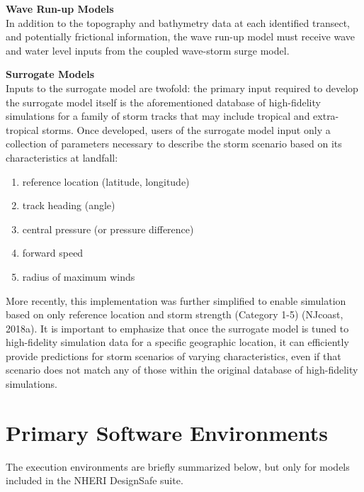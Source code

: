 \noindent\textbf{Wave Run-up Models} \\In addition to the topography and bathymetry data at each identified transect, and potentially frictional information, the wave run-up model must receive wave and water level inputs from the coupled wave-storm surge model.
\newline

\noindent\textbf{Surrogate Models} \\Inputs to the surrogate model are twofold: the primary input required to develop the surrogate model itself is the aforementioned database of high-fidelity simulations for a family of storm tracks that may include tropical and extra-tropical storms. Once developed, users of the surrogate model input only a collection of parameters necessary to describe the storm scenario based on its characteristics at landfall: 

\begin{enumerate}
    \item reference location (latitude, longitude)
    \item track heading (angle)
    \item central pressure (or pressure difference)
    \item forward speed
    \item radius of maximum winds
\end{enumerate}

More recently, this implementation was further simplified to enable simulation based on only reference location and storm strength (Category 1-5) (NJcoast, 2018a). It is important to emphasize that once the surrogate model is tuned to high-fidelity simulation data for a specific geographic location, it can efficiently provide predictions for storm scenarios of varying characteristics, even if that scenario does not match any of those within the original database of high-fidelity simulations. 

\section{Primary Software Environments}
\label{sec:storm_surge_tools}

The execution environments are briefly summarized below, but only for models included in the NHERI DesignSafe suite. 
\newline

